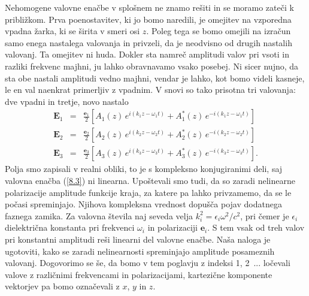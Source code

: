 Nehomogene valovne enačbe v splošnem ne znamo rešiti in se moramo zateči k približkom.
Prva poenostavitev, ki jo bomo naredili, je omejitev na vzporedna vpadna žarka,
ki se širita v smeri osi $z$. Poleg tega se bomo omejili na izračun samo enega
nastalega valovanja in privzeli, da je neodvisno od drugih nastalih valovanj.
Ta omejitev ni huda. Dokler sta namreč amplitudi valov pri vsoti in razliki
frekvenc majhni, ju lahko obravnavamo vsako posebej. Ni sicer nujno,
da sta obe nastali amplitudi vedno majhni, vendar je lahko, kot bomo videli kasneje, 
le en val naenkrat primerljiv z vpadnim. V snovi so tako prisotna tri valovanja:
dve vpadni in tretje, novo nastalo
\begin{eqnarray}
\mathbf{E}_{1} & = & \frac{\mathbf{e}_{1}}{2}\left[A_{1}(z)\, 
e^{i(k_{1}z-\omega_{1}t)}+A_{1}^{*}(z)\, e^{-i(k_{1}z-\omega_{1}t)}\right]\nonumber \\
\mathbf{E}_{2} & = & \frac{\mathbf{e}_{2}}{2}\left[A_{2}(z)\, 
e^{i(k_{2}z-\omega_{2}t)}+A_{2}^{*}(z)\, e^{-i(k_{2}z-\omega_{2}t)}\right]\nonumber \\
\mathbf{E}_{3} & = & \frac{\mathbf{e}_{3}}{2}\left[A_{3}(z)\, 
e^{i(k_{3}z-\omega_{3}t)}+A_{3}^{*}(z)\, e^{-i(k_{3}z-\omega_{3}t)}\right].
\end{eqnarray}
Polja smo zapisali v realni obliki, to je s kompleksno konjugiranimi
deli, saj valovna enačba (\ref{8.3}) ni linearna. Upoštevali smo tudi,
da so zaradi nelinearne polarizacije amplitude funkcije kraja, za
katere pa lahko privzamemo, da se le počasi spreminjajo. Njihova kompleksna vrednost
dopušča pojav dodatnega faznega zamika. Za valovna
števila naj seveda velja $k_{i}^{2}=\epsilon_{i}\omega^{2}/c^{2}$,
pri čemer je $\epsilon_{i}$ dielektrična konstanta pri frekvenci
$\omega_{i}$ in polarizaciji $\mathbf{e}_{i}$. S tem vsak od treh valov
pri konstantni amplitudi reši linearni del valovne enačbe. Naša naloga
je ugotoviti, kako se zaradi nelinearnosti spreminjajo amplitude posameznih valovanj.
Dogovorimo se še, da bomo v tem poglavju z indeksi 1, 2~... ločevali
valove z različnimi frekvencami in polarizacijami, kartezične komponente
vektorjev pa bomo označevali z $x$, $y$ in $z$. 

